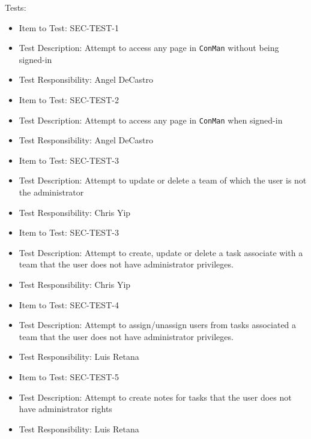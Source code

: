 \documentclass{article}
\begin{document}
Tests:
\begin{itemize}
\item Item to Test: SEC-TEST-1
\item Test Description: Attempt to access any page in \texttt{ConMan} without 
being signed-in
\item Test Responsibility: Angel DeCastro
\end{itemize}
\begin{itemize}
\item Item to Test: SEC-TEST-2
\item Test Description: Attempt to access any page in \texttt{ConMan} when 
signed-in
\item Test Responsibility: Angel DeCastro
\end{itemize}
\begin{itemize}
\item Item to Test: SEC-TEST-3
\item Test Description: Attempt to update or delete a team of which the user is not the administrator
\item Test Responsibility: Chris Yip
\end{itemize}
\begin{itemize}
\item Item to Test: SEC-TEST-3
\item Test Description: Attempt to create, update or delete a task associate with 
a team that the user does not have administrator privileges.
\item Test Responsibility: Chris Yip
\end{itemize}
\begin{itemize}
\item Item to Test: SEC-TEST-4
\item Test Description: Attempt to assign/unassign users from tasks associated 
a team that the user does not have administrator privileges.
\item Test Responsibility: Luis Retana
\end{itemize}
\begin{itemize}
\item Item to Test: SEC-TEST-5
\item Test Description: Attempt to create notes for tasks that the user does not have administrator rights
\item Test Responsibility: Luis Retana
\end{itemize}
\end{document}
